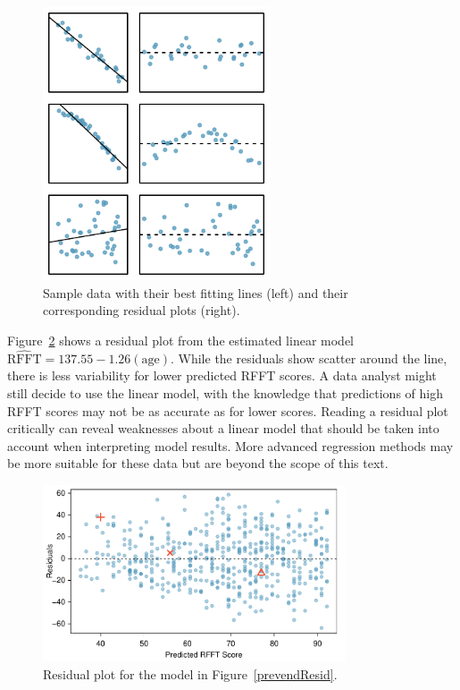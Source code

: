 \begin{figure}[h!]
\centering
\includegraphics[width=0.6\textwidth]
{ch_simple_linear_regression_oi_biostat/figures/sampleLinesAndResPlots/sampleLinesAndResPlots.pdf}
\caption{Sample data with their best fitting lines (left) and their corresponding residual plots (right).}
\label{sampleLinesAndResPlots}
\end{figure}

Figure~\ref{prevendResidualPlot} shows a residual plot from the estimated linear model $\widehat{\text{RFFT}} = 137.55 - 1.26(\text{age})$. While the residuals show scatter around the line, there is less variability for lower predicted RFFT scores. A data analyst might still decide to use the linear model, with the knowledge that predictions of high RFFT scores may not be as accurate as for lower scores. Reading a residual plot critically can reveal weaknesses about a linear model that should be taken into account when interpreting model results. More advanced regression methods may be more suitable for these data but are beyond the scope of this text.


\begin{figure}[h]
	\centering
	\includegraphics[width=0.8\textwidth]{ch_simple_linear_regression_oi_biostat/figures/prevendResidPlot/prevendResidPlot}
	\caption{Residual plot for the model in Figure~\ref{prevendResid}.}
	\label{prevendResidualPlot}
\end{figure}

